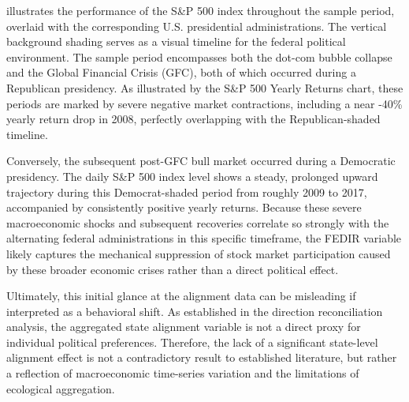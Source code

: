  illustrates the performance of the S\&P 500 index throughout the sample period, overlaid with the corresponding U.S. presidential administrations. The vertical background shading serves as a visual timeline for the federal political environment. The sample period encompasses both the dot-com bubble collapse and the Global Financial Crisis (GFC), both of which occurred during a Republican presidency. As illustrated by the S\&P 500 Yearly Returns chart, these periods are marked by severe negative market contractions, including a near -40\% yearly return drop in 2008, perfectly overlapping with the Republican-shaded timeline.

Conversely, the subsequent post-GFC bull market occurred during a Democratic presidency. The daily S\&P 500 index level shows a steady, prolonged upward trajectory during this Democrat-shaded period from roughly 2009 to 2017, accompanied by consistently positive yearly returns. Because these severe macroeconomic shocks and subsequent recoveries correlate so strongly with the alternating federal administrations in this specific timeframe, the FEDIR variable likely captures the mechanical suppression of stock market participation caused by these broader economic crises rather than a direct political effect.

Ultimately, this initial glance at the alignment data can be misleading if interpreted as a behavioral shift. As established in the direction reconciliation analysis, the aggregated state alignment variable is not a direct proxy for individual political preferences. Therefore, the lack of a significant state-level alignment effect is not a contradictory result to established literature, but rather a reflection of macroeconomic time-series variation and the limitations of ecological aggregation.


